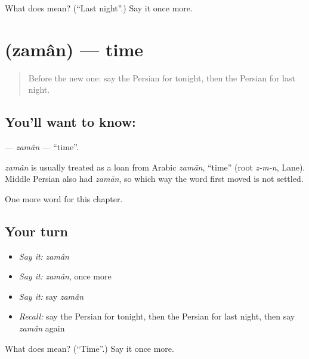 \begin{tcolorbox}[breakable,colback=teal!4,colframe=teal!35!black,title={Before you move on}]
What does  mean? (\textquotedblleft{}Last night\textquotedblright{}.) Say it once more.
\end{tcolorbox}
\section[\texorpdfstring{\fa{زمان} (zamân)}{زمان (zamân)}]{ (zamân) — time}

\label{lesson:FA-C79-zaman}



\begin{quote}
Before the new one: say the Persian for tonight, then the Persian for last night.
\end{quote}

\subsection*{You'll want to know: }
\textbf{} — \emph{zamân} — \textquotedblleft{}time\textquotedblright{}.

\begin{cousinweb}
\emph{zamân} is usually treated as a loan from Arabic \emph{zamān}, \textquotedblleft{}time\textquotedblright{} (root \emph{z-m-n}, Lane). Middle Persian also had \emph{zamān}, so which way the word first moved is not settled.
\end{cousinweb}

\begin{grammarlens}[title={What you've built}]
One more word for this chapter.
\end{grammarlens}

\subsection*{Your turn}
\begin{itemize}
\raggedright
  \item \emph{Say it:} \emph{zamân}
  \item \emph{Say it:} \emph{zamân}, once more
  \item \emph{Say it:} say \emph{zamân}
  \item \emph{Recall:} say the Persian for tonight, then the Persian for last night, then say \emph{zamân} again
\end{itemize}

\begin{tcolorbox}[breakable,colback=teal!4,colframe=teal!35!black,title={Before you move on}]
What does  mean? (\textquotedblleft{}Time\textquotedblright{}.) Say it once more.
\end{tcolorbox}
